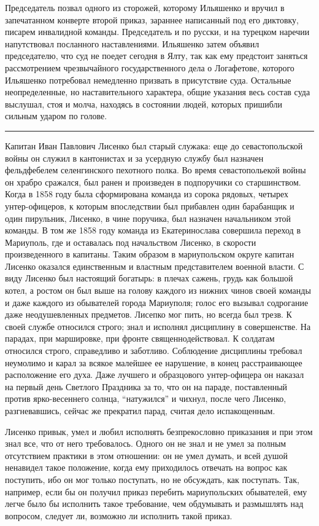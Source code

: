 \documentclass[a4paper,20pt]{article}
\begin{document}
Председатель позвал одного из сторожей, которому Ильяшенко и вручил в
запечатанном конверте второй приказ, зараннее написанный под его диктовку,
писарем инвалидной команды. Председатель и по русски, и на турецком наречии
напутствовал посланного наставлениями. Ильяшенко затем объявил председателю,
что суд не поедет сегодня в Ялту, так как ему предстоит заняться рассмотрением
чрезвычайного государственного дела о Логафетове, которого Ильяшенко потребовал
немедленно призвать в присутствие суда. Остальные неопределенные, но
наставительного характера, общие указания весь состав суда выслушал, стоя и
молча, находясь в состоянии людей, которых пришибли сильным ударом по голове.

\par\noindent\rule{\textwidth}{0.4pt}

Капитан Иван Павлович Лисенко был старый служака: еще до севастопольской войны
он служил в кантонистах и за усердную службу был назначен фельдфебелем
селенгинского пехотного полка. Во время севастопольекой
войны он храбро сражался, был ранен и произведен в
подпоручики со старшинством. Когда в 1858 году была
сформирована команда из сорока рядовых, четырех унтер-офицеров, к которым впоследствии был прибавлен один
барабанщик и один пирульник, Лисенко, в чине поручика, был назначен начальником этой команды. В том 
же 1858 году команда из Екатеринослава совершила переход в Мариуполь, 
где и оставалась под начальством
Лисенко, в скорости произведенного в капитаны. Таким
образом в мариупольском округе капитан Лисенко оказался единственным и 
властным представителем военной
власти. С виду Лисенко был настоящий богатырь: в плечах сажень, 
грудь как большой котел, а ростом он
был выше на голову каждого из нижних чинов своей
команды и даже каждого из обывателей города Мариуполя;
голос его вызывал содрогание даже неодушевленных предметов. 
Лисепко мог пить, но всегда был трезв. К своей
службе относился строго; знал и исполнял дисциплину
в совершенстве. На парадах, при маршировке, при фронте
священнодействовал. К солдатам относился строго, справедливо и заботливо. Соблюдение дисциплины требовал
неумолимо и карал за всякое малейшее ее нарушение, в конец расстраивающее расположение его духа. Даже 
лучшего и образцового унтер-офицера он наказал на первый день Светлого Праздника за то, что он 
на параде, поставленный против ярко-весеннего солнца, ``натужился'' и чихнул, после чего Лисенко, разгневавшись, сейчас
же прекратил парад, считая дело испакощенным. 

Лисенко привык, умел и любил исполнять безпрекословно приказания и при этом
знал все, что от него требовалось. Одного он не знал и не умел за полным
отсутствием  практики в этом отношении: он не умел думать, и всей душой
ненавидел такое положение, когда ему приходилось отвечать на вопрос как
поступить, ибо он мог только поступать, но не обсуждать, как поступать. Так,
например, если бы он получил приказ перебить мариупольских обывателей, ему
легче было бы исполнить такое требование, чем обдумывать и размышлять над
вопросом, следует ли, возможно ли исполнить такой приказ.
\end{document}
